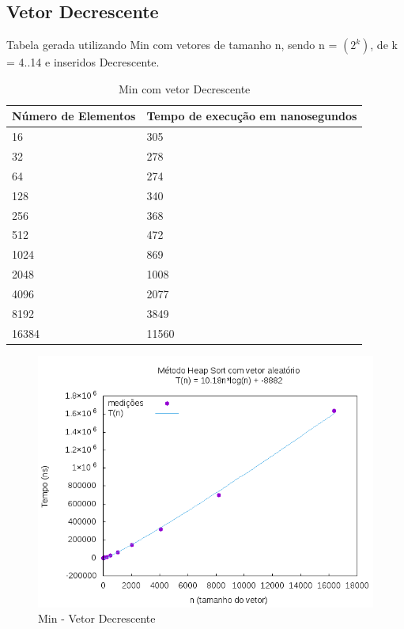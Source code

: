 \documentclass[12pt,a4paper,twoside]{report}
\begin{document}
\subsection{Vetor Decrescente}
Tabela gerada utilizando Min com vetores de tamanho n, sendo n = $(2^k)$, de k = 4..14 e inseridos Decrescente.
\begin{table}[H]
\centering
\caption{Min com vetor Decrescente}
\label{my-label}
\begin{tabular}{|l|l|}
\hline
\multicolumn{1}{|c|}{\textbf{Número de Elementos}} & \multicolumn{1}{c|}{\textbf{Tempo de execução em nanosegundos}} \\ \hline
16 & 305 \\ \hline
32 & 278 \\ \hline
64 & 274 \\ \hline
128 & 340 \\ \hline
256 & 368 \\ \hline
512 & 472 \\ \hline
1024 & 869 \\ \hline
2048 & 1008 \\ \hline
4096 & 2077 \\ \hline
8192 & 3849 \\ \hline
16384 & 11560 \\ \hline

\end{tabular}
\end{table}

\begin{figure}[H]
    \centering
    \includegraphics[width=0.7\linewidth]{graficos/HeapSort/vIntAleatorio/vIntAleatorio.png}
  \caption{Min - Vetor Decrescente}
\end{figure}
\end{document}
